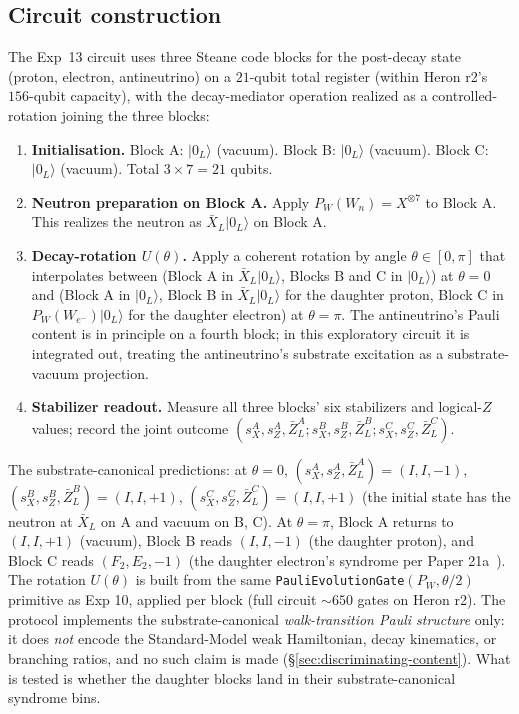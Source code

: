 \documentclass[11pt]{article}
\newcommand{\barX}{\bar X_L}
\newcommand{\barZ}{\bar Z_L}
\begin{document}
\subsection{Circuit construction}
\label{sec:neutron-decay-circuit}

The Exp~13 circuit uses three Steane code blocks for the post-decay state (proton, electron, antineutrino) on a $21$-qubit total register (within Heron r2's $156$-qubit capacity), with the decay-mediator operation realized as a controlled-rotation joining the three blocks:

\begin{enumerate}
\item \textbf{Initialisation.}  Block A: $|0_L\rangle$ (vacuum).  Block B: $|0_L\rangle$ (vacuum).  Block C: $|0_L\rangle$ (vacuum).  Total $3 \times 7 = 21$ qubits.
\item \textbf{Neutron preparation on Block A.}  Apply $P_W(W_n) = X^{\otimes 7}$ to Block A.  This realizes the neutron as $\barX |0_L\rangle$ on Block A.
\item \textbf{Decay-rotation $U(\theta)$.}  Apply a coherent rotation by angle $\theta \in [0, \pi]$ that interpolates between (Block A in $\barX |0_L\rangle$, Blocks B and C in $|0_L\rangle$) at $\theta = 0$ and (Block A in $|0_L\rangle$, Block B in $\barX |0_L\rangle$ for the daughter proton, Block C in $P_W(W_{e^-}) |0_L\rangle$ for the daughter electron) at $\theta = \pi$.  The antineutrino's Pauli content is in principle on a fourth block; in this exploratory circuit it is integrated out, treating the antineutrino's substrate excitation as a substrate-vacuum projection.
\item \textbf{Stabilizer readout.}  Measure all three blocks' six stabilizers and logical-$Z$ values; record the joint outcome $(s_X^A, s_Z^A, \barZ^A; s_X^B, s_Z^B, \barZ^B; s_X^C, s_Z^C, \barZ^C)$.
\end{enumerate}

The substrate-canonical predictions: at $\theta = 0$, $(s_X^A, s_Z^A, \barZ^A) = (I, I, -1)$, $(s_X^B, s_Z^B, \barZ^B) = (I, I, +1)$, $(s_X^C, s_Z^C, \barZ^C) = (I, I, +1)$ (the initial state has the neutron at $\barX$ on A and vacuum on B, C).  At $\theta = \pi$, Block A returns to $(I, I, +1)$ (vacuum), Block B reads $(I, I, -1)$ (the daughter proton), and Block C reads $(F_2, E_2, -1)$ (the daughter electron's syndrome per Paper 21a~\cite[Table 4]{Paper21a}).  The rotation $U(\theta)$ is built from the same \texttt{PauliEvolutionGate}$(P_W, \theta/2)$ primitive as Exp 10, applied per block (full circuit $\sim 650$ gates on Heron r2).  The protocol implements the substrate-canonical \emph{walk-transition Pauli structure} only: it does \emph{not} encode the Standard-Model weak Hamiltonian, decay kinematics, or branching ratios, and no such claim is made (\S\ref{sec:discriminating-content}).  What is tested is whether the daughter blocks land in their substrate-canonical syndrome bins.
\end{document}
